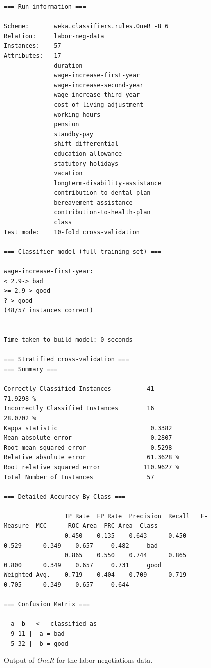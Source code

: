 \begin{figure}[!p]
\begin{mdframed}[innermargin=-1.5cm]
\begin{Verbatim}[fontsize=\scriptsize]
=== Run information ===

Scheme:       weka.classifiers.rules.OneR -B 6
Relation:     labor-neg-data
Instances:    57
Attributes:   17
              duration
              wage-increase-first-year
              wage-increase-second-year
              wage-increase-third-year
              cost-of-living-adjustment
              working-hours
              pension
              standby-pay
              shift-differential
              education-allowance
              statutory-holidays
              vacation
              longterm-disability-assistance
              contribution-to-dental-plan
              bereavement-assistance
              contribution-to-health-plan
              class
Test mode:    10-fold cross-validation

=== Classifier model (full training set) ===

wage-increase-first-year:
< 2.9-> bad
>= 2.9-> good
?-> good
(48/57 instances correct)


Time taken to build model: 0 seconds

=== Stratified cross-validation ===
=== Summary ===

Correctly Classified Instances          41               71.9298 %
Incorrectly Classified Instances        16               28.0702 %
Kappa statistic                          0.3382
Mean absolute error                      0.2807
Root mean squared error                  0.5298
Relative absolute error                 61.3628 %
Root relative squared error            110.9627 %
Total Number of Instances               57     

=== Detailed Accuracy By Class ===

                 TP Rate  FP Rate  Precision  Recall   F-Measure  MCC      ROC Area  PRC Area  Class
                 0.450    0.135    0.643      0.450    0.529      0.349    0.657     0.482     bad
                 0.865    0.550    0.744      0.865    0.800      0.349    0.657     0.731     good
Weighted Avg.    0.719    0.404    0.709      0.719    0.705      0.349    0.657     0.644     

=== Confusion Matrix ===

  a  b   <-- classified as
  9 11 |  a = bad
  5 32 |  b = good
\end{Verbatim}
\end{mdframed}
\caption{\label{fig:oneR_output}Output of \textit{OneR} for the labor negotiations data.}
\end{figure}

